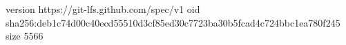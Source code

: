 version https://git-lfs.github.com/spec/v1
oid sha256:deb1c74d00c40ecd55510d3cf85ed30c7723ba30b5fcad4c724bbc1ea780f245
size 5566
